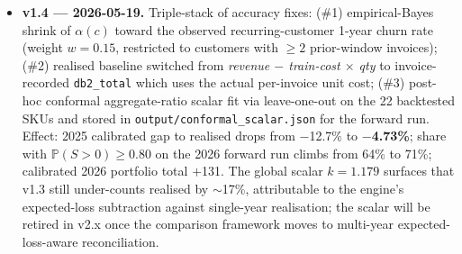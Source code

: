 \documentclass[11pt,a4paper]{article}
\newcommand{\Prob}{\mathbb{P}}
\begin{document}
\begin{itemize}[leftmargin=2em,itemsep=2pt]
  \item \textbf{v1.4 --- 2026-05-19.} Triple-stack of accuracy fixes: (\#1) empirical-Bayes shrink of $\alpha(c)$ toward the observed recurring-customer 1-year churn rate (weight $w=0.15$, restricted to customers with $\geq 2$ prior-window invoices); (\#2) realised baseline switched from \emph{revenue $-$ train-cost $\times$ qty} to invoice-recorded \texttt{db2\_total} which uses the actual per-invoice unit cost; (\#3) post-hoc conformal aggregate-ratio scalar fit via leave-one-out on the 22 backtested SKUs and stored in \texttt{output/conformal\_scalar.json} for the forward run. Effect: 2025 calibrated gap to realised drops from $-$12.7\% to \textbf{$-$4.73\%}; share with $\Prob(S>0) \geq 0.80$ on the 2026 forward run climbs from 64\% to 71\%; calibrated 2026 portfolio total $+$131. The global scalar $k=1.179$ surfaces that v1.3 still under-counts realised by $\sim$17\%, attributable to the engine's expected-loss subtraction against single-year realisation; the scalar will be retired in v2.x once the comparison framework moves to multi-year expected-loss-aware reconciliation.
\end{itemize}
\end{document}
